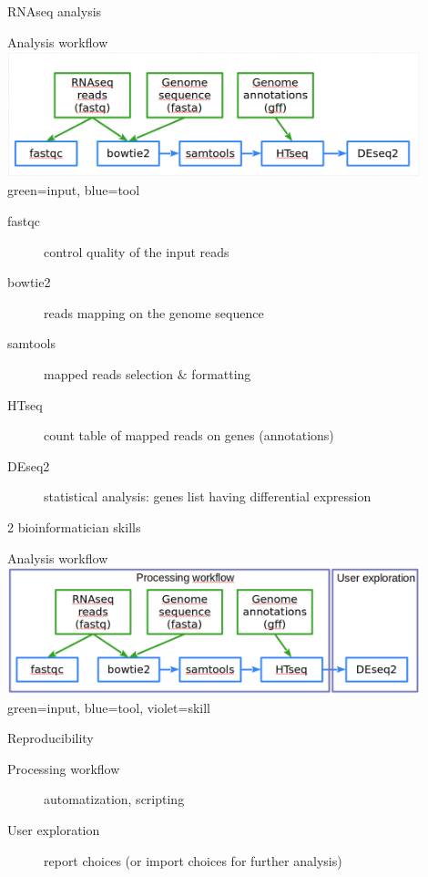 \begin{frame}[label=RNAseqWF_diapo]{RNAseq analysis}
\begin{block}{Analysis workflow}
    \includegraphics[width=12cm]{01_introduction/images/FAIR_RNAseq_WF.png}\\
green=input, blue=tool
\end{block}
\footnotesize{
\begin{description}
    \item[fastqc] control quality of the input reads
    \item[bowtie2] reads mapping on the genome sequence
    \item[samtools] mapped reads selection $\&$ formatting
    \item[HTseq] count table of mapped reads on genes (annotations)
    \item[DEseq2] statistical analysis: genes list having differential expression
\end{description}
}
\end{frame}
\begin{frame}[label=RNAseqWF2skill_diapo]{2 bioinformatician skills}
\begin{block}{Analysis workflow}
    \includegraphics[width=12cm]{01_introduction/images/FAIR_RNAseq_WF_2skills.png}\\
green=input, blue=tool, violet=skill
\end{block}
\begin{block}{Reproducibility}
\begin{description}
    \item[Processing workflow] automatization, scripting
    \item[User exploration] report choices (or import choices for further analysis) 
\end{description}
\end{block}
\end{frame}